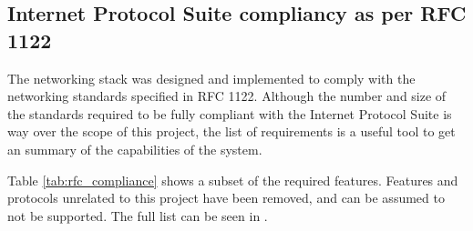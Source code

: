 \subsection{Internet Protocol Suite compliancy as per RFC 1122}
The networking stack was designed and implemented to comply with the networking
standards specified in RFC 1122. Although the number and size of the standards
required to be fully compliant with the Internet Protocol Suite is way over the
scope of this project, the list of requirements is a useful tool to get an
summary of the capabilities of the system.

Table \ref{tab:rfc_compliance} shows a subset of the required features.
Features and protocols unrelated to this project have been removed, and can be
assumed to not be supported. The full list can be seen in \cite[Section 3.5,
Page 72]{RFC1122}.


